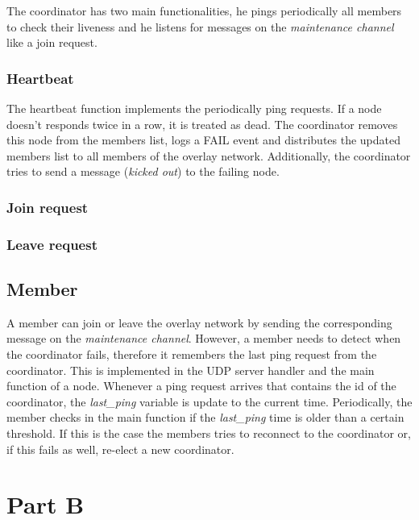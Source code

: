 \documentclass[paper=a4, fontsize=11pt]{scrartcl} %
\numberwithin{equation}{section} %
\numberwithin{figure}{section} %
\numberwithin{table}{section} %
\begin{document}
The coordinator has two main functionalities, he pings periodically all members to check their liveness and he listens for messages on the \textit{maintenance channel} like a join request. 

\subsubsection{Heartbeat}
The heartbeat function implements the periodically ping requests.
If a node doesn't responds twice in a row, it is treated as dead. The coordinator removes this node from the members list, logs a FAIL event and distributes the updated members list to all members of the overlay network. Additionally, the coordinator tries to send a message (\textit{kicked out}) to the failing node.

\subsubsection{Join request}

\subsubsection{Leave request}


\subsection{Member}

A member can join or leave the overlay network by sending the corresponding message on the \textit{maintenance channel}. However, a member needs to detect when the coordinator fails, therefore it remembers the last ping request from the coordinator. This is implemented in the UDP server handler and the main function of a node. Whenever a ping request arrives that contains the id of the coordinator, the \textit{last\_ping} variable is update to the current time. Periodically, the member checks in the main function if the \textit{last\_ping} time is older than a certain threshold. If this is the case the members tries to reconnect to the coordinator or, if this fails as well, re-elect a new coordinator. 


\section{Part B}
\end{document}
